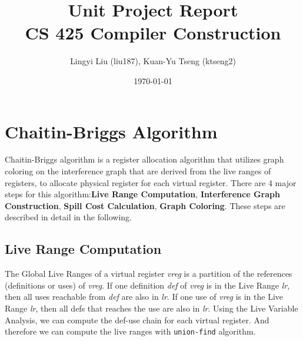 \documentclass{article}
\title{Unit Project Report \\ CS 425 Compiler Construction} %
\author{Lingyi Liu (liu187), Kuan-Yu Tseng (ktseng2)} %
\date{\today} %
\begin{document}
\maketitle %


\section{Chaitin-Briggs Algorithm}
Chaitin-Briggs algorithm\cite{Chaitin:1982} is a register allocation algorithm that utilizes graph coloring on the interference graph that are derived from the live ranges of registers, to allocate physical register for each virtual register. There are 4 major steps for this algorithm:\textbf{Live Range Computation}, \textbf{Interference Graph Construction}, \textbf{Spill Cost Calculation}, \textbf{Graph Coloring}. These steps are described in detail in the following.
\subsection{Live Range Computation}
\label{live_range}
The Global Live Ranges of a virtual register \emph{vreg} is a partition of the references (definitions or uses) of \emph{vreg}. If one definition \emph{def} of \emph{vreg} is in the Live Range \emph{lr}, then all uses reachable from \emph{def} are also in \emph{lr}. If one use of \emph{vreg} is in the Live Range \emph{lr}, then all defs that reaches the use are also in \emph{lr}. Using the Live Variable Analysis, we can compute the def-use chain for each virtual register. And therefore we can compute the live ranges with \texttt{union-find} algorithm.
\end{document}
